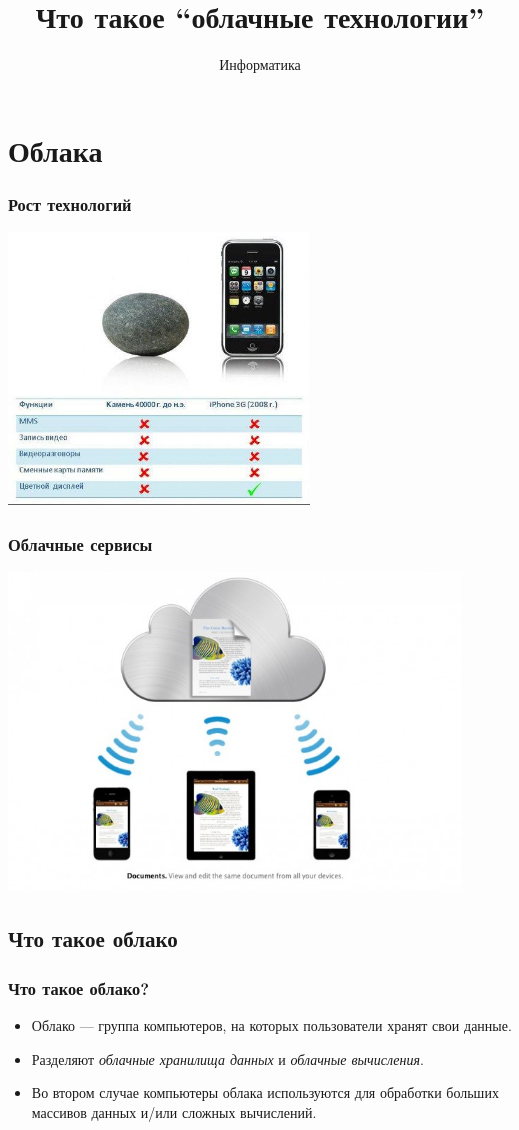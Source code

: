 \documentclass[compress,red]{beamer}
\title{Что такое ``облачные технологии''}
\author{Информатика}
\date{}
\begin{document}
\maketitle

\section{Облака}

\begin{frame}[fragile]
  \frametitle{Рост технологий}
  \centerline{\includegraphics[width=0.6\textwidth]{images/iphone-vs-stone.png}}
\end{frame}

\begin{frame}[fragile]
  \frametitle{Облачные сервисы}
  \centerline{\includegraphics[width=0.9\textwidth]{images/icloud.jpg}}
\end{frame}

\subsection{Что такое облако}
\begin{frame}[fragile]
  \frametitle{Что такое облако?}
  \begin{itemize}
    \item Облако --- группа компьютеров, на которых пользователи хранят свои данные.
    \item Разделяют \emph{облачные хранилища данных} и \emph{облачные вычисления}.
    \item Во втором случае компьютеры облака используются для обработки больших массивов данных и/или сложных вычислений.
  \end{itemize}
\end{frame}
\end{document}
